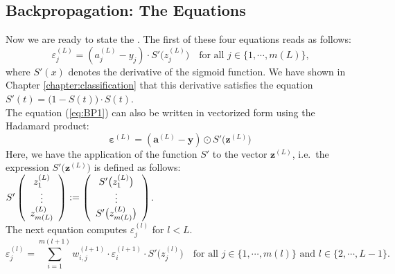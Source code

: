 \subsection{Backpropagation: The Equations}
Now we are ready to state the .  The first of these four equations reads as follows:
\begin{equation}
  \label{eq:BP1}
  \varepsilon^{(L)}_j = (a_j^{(L)} - y_j) \cdot S'\bigl(z_j^{(L)}\bigr)
 \quad \mbox{for all $j \in \{1, \cdots, m(L)\}$,}
  \tag{BP1}
\end{equation}
where $S'(x)$ denotes the derivative of the sigmoid function.  We have shown in Chapter
\ref{chapter:classification} that this derivative satisfies the equation
\\[0.2cm]
\hspace*{1.3cm}
$S'(t) = \bigl(1 - S(t)\bigr) \cdot S(t)$.
\\[0.2cm]
The equation (\ref{eq:BP1}) can also be written in vectorized form using the Hadamard product:
\begin{equation}
  \label{eq:BP1s}
\boldsymbol{\varepsilon}^{(L)} = (\mathbf{a}^{(L)} - \mathbf{y}) \odot S'\bigl(\mathbf{z}^{(L)}\bigr)  
\tag{BP1v}
\end{equation}
Here, we have  the application of the function $S'$ to the vector $\mathbf{z}^{(L)}$, i.e.~the
expression $S'\bigl(\mathbf{z}^{(L)}\bigr)$ is defined as follows:
\\[0.2cm]
\hspace*{1.3cm}
$ S'\left(
  \begin{array}[c]{c}
   z_1^{(L)}      \\
   \vdots       \\
   z_{m(L)}^{(L)} 
  \end{array}
  \right) := \left(
  \begin{array}[c]{c}
   S'\bigl(z_1^{(L)}\bigr)      \\
   \vdots       \\
   S'\bigl(z_{m(L)}^{(L)}\bigr)
  \end{array}
  \right)
$.
\\[0.2cm]
The next equation computes $\varepsilon_j^{(l)}$ for $l < L$.  
\begin{equation}
  \label{eq:BP2}
  \varepsilon^{(l)}_j = \sum\limits_{i=1}^{m(l+1)} w_{i,j}^{(l+1)} \cdot \varepsilon^{(l+1)}_i \cdot
  S'\bigl(z^{(l)}_j\bigr) \quad \mbox{for all $j \in \{1, \cdots, m(l)\}$ and $l \in \{2, \cdots, L-1\}$}.
  \tag{BP2}
\end{equation}

